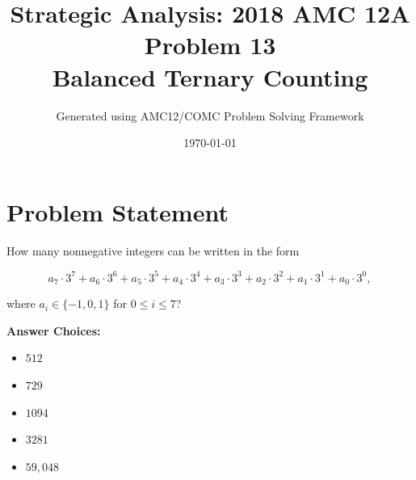 \documentclass[12pt]{article}
\title{\textbf{Strategic Analysis: 2018 AMC 12A Problem 13\\Balanced Ternary Counting}}
\author{Generated using AMC12/COMC Problem Solving Framework}
\date{\today}
\begin{document}
\maketitle

\section*{Problem Statement}

How many nonnegative integers can be written in the form

\[a_7\cdot3^7+a_6\cdot3^6+a_5\cdot3^5+a_4\cdot3^4+a_3\cdot3^3+a_2\cdot3^2+a_1\cdot3^1+a_0\cdot3^0,\]

where $a_i\in \{-1,0,1\}$ for $0\leq i \leq 7$?

\textbf{Answer Choices:}
\begin{itemize}
    \item[(A)] $512$
    \item[(B)] $729$
    \item[(C)] $1094$
    \item[(D)] $3281$
    \item[(E)] $59,048$
\end{itemize}
\end{document}
